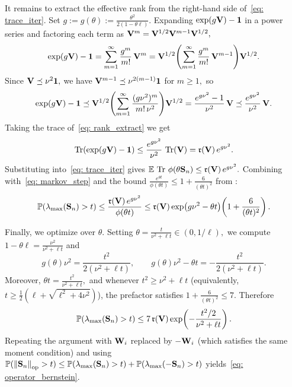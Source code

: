 \documentclass[mnsc]{informs3aa} %
\DeclareMathOperator{\Tr}{Tr}
\newcommand{\norm}[1]{\left\|#1\right\|}
\newcommand{\idty}{\mathbf{1}}
\def\sr{\mathfrak{r}}
\newcommand{\op}{\mathrm{op}}
\begin{document}
It remains to extract the effective rank from the right-hand side of~\eqref{eq: trace_iter}. Set $g:=g(\theta):=\frac{\theta^2}{2(1-\theta \ell)}.$ Expanding $\exp(g\bold{V})-\idty$ in a power series and factoring each term as $\bold{V}^m=\bold{V}^{1/2}\bold{V}^{m-1}\bold{V}^{1/2},$
\[\exp(g\bold{V})-\idty=\sum_{m=1}^{\infty}\frac{g^m}{m!}\,\bold{V}^m=\bold{V}^{1/2}\!\left(\sum_{m=1}^{\infty}\frac{g^m}{m!}\,\bold{V}^{m-1}\right)\!\bold{V}^{1/2}.\]
Since $\bold{V}\preceq\nu^2\idty,$ we have $\bold{V}^{m-1}\preceq\nu^{2(m-1)}\idty$ for $m\geq 1,$ so
\begin{equation}\label{eq: rank_extract}
\exp(g\bold{V})-\idty\preceq\bold{V}^{1/2}\!\left(\sum_{m=1}^{\infty}\frac{(g\nu^2)^m}{m!\,\nu^2}\right)\!\bold{V}^{1/2}=\frac{e^{g\nu^2}-1}{\nu^2}\,\bold{V}\preceq\frac{e^{g\nu^2}}{\nu^2}\,\bold{V}.
\end{equation}
Taking the trace of~\eqref{eq: rank_extract} we get
\[\Tr\!\left(\exp(g\bold{V})-\idty\right)\leq\frac{e^{g\nu^2}}{\nu^2}\,\Tr(\bold{V})=\sr(\bold{V})\,e^{g\nu^2}.\]
Substituting into~\eqref{eq: trace_iter} gives $\mathbb{E}\,\Tr\,\phi(\theta\bold{S}_n)\leq\sr(\bold{V})\,e^{g\nu^2}.$ Combining with~\eqref{eq: markov_step} and the bound $\frac{e^{\theta t}}{\phi(\theta t)}\leq 1+\frac{6}{(\theta t)^2}$ from \citet[inequality~(3.8)]{minsker2017}:
\begin{equation}\label{eq: combined_bound}
\mathbb{P}(\lambda_{\max}(\bold{S}_n)>t)\leq\frac{\sr(\bold{V})\,e^{g\nu^2}}{\phi(\theta t)}\leq \sr(\bold{V})\exp\!\left(g\nu^2-\theta t\right)\!\left(1+\frac{6}{(\theta t)^2}\right).
\end{equation}

Finally, we optimize over $\theta.$ Setting $\theta=\frac{t}{\nu^2+\ell t}\in(0,1/\ell),$ we compute $1-\theta \ell=\frac{\nu^2}{\nu^2+\ell t}$ and
\[g(\theta)\nu^2=\frac{t^2}{2(\nu^2+\ell t)},\qquad g(\theta)\nu^2-\theta t=-\frac{t^2}{2(\nu^2+\ell t)}.\]
Moreover, $\theta t=\frac{t^2}{\nu^2+\ell t},$ and whenever $t^2\geq\nu^2+\ell t$ (equivalently, $t\geq\frac{1}{2}(\ell+\sqrt{\ell^2+4\nu^2})$), the prefactor satisfies $1+\frac{6}{(\theta t)^2}\leq 7.$ Therefore
\[\mathbb{P}(\lambda_{\max}(\bold{S}_n)>t)\leq 7\,\sr(\bold{V})\exp\!\left(-\frac{t^2/2}{\nu^2+\ell t}\right).\]
Repeating the argument with $\bold{W}_i$ replaced by $-\bold{W}_i$ (which satisfies the same moment condition) and using $\mathbb{P}(\norm{\bold{S}_n}_{\op}>t)\leq\mathbb{P}(\lambda_{\max}(\bold{S}_n)>t)+\mathbb{P}(\lambda_{\max}(-\bold{S}_n)>t)$ yields~\eqref{eq: operator_bernstein}.\Halmos
\endproof
\end{document}
